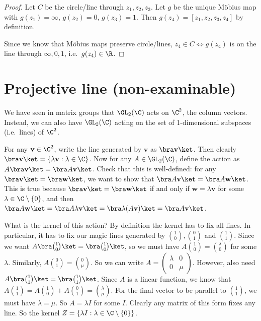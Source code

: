 \documentclass[a4paper]{article}
\begin{document}
\begin{proof}
  Let $C$ be the circle/line through $z_1, z_2, z_3$. Let $g$ be the unique M\"obius map with $g(z_1) = \infty$, $g(z_2) = 0$, $g(z_3) = 1$. Then $g(z_4) = [z_1, z_2, z_3, z_4]$ by definition.

  Since we know that M\"obius maps preserve circle/lines, $z_4\in C \Leftrightarrow g(z_4)$ is on the line through $\infty, 0, 1$, i.e.\ $g(z_4) \in \R$.
\end{proof}

\section{Projective line (non-examinable)}
We have seen in matrix groups that $\GL_2(\C)$ acts on $\C^2$, the column vectors. Instead, we can also have $\GL_2(\C)$ acting on the set of 1-dimensional subspaces (i.e.\ lines) of $\C^2$.

For any $\mathbf{v}\in \C^2$, write the line generated by $\mathbf{v}$ as $\bra \mathbf{v}\ket$. Then clearly $\bra \mathbf{v} \ket = \{\lambda \mathbf{v}: \lambda\in \C\}$. Now for any $A\in \GL_2(\C)$, define the action as $A\bra \mathbf{v}\ket = \bra A\mathbf{v}\ket$. Check that this is well-defined: for any $\bra \mathbf{v} \ket = \bra \mathbf{w}\ket$, we want to show that $\bra A\mathbf{v}\ket = \bra A\mathbf{w}\ket$. This is true because $\bra \mathbf{v} \ket = \bra \mathbf{w}\ket$ if and only if $\mathbf{w} = \lambda \mathbf{v}$ for some $\lambda\in \C\setminus\{0\}$, and then $\bra A\mathbf{w}\ket = \bra A\lambda\mathbf{v}\ket = \bra \lambda (A\mathbf{v})\ket = \bra A\mathbf{v}\ket$.

What is the kernel of this action? By definition the kernel has to fix all lines. In particular, it has to fix our magic lines generated by $\binom{1}{0}, \binom{0}{1}$ and $\binom{1}{1}$. Since we want $A\bra \binom{1}{0}\ket = \bra \binom{1}{0}\ket$, so we must have $A\binom{1}{0} = \binom{\lambda}{0}$ for some $\lambda$. Similarly, $A\binom{0}{1} = \binom{0}{\mu}$. So we can write $A =
\begin{pmatrix}
  \lambda & 0\\
  0 & \mu
\end{pmatrix}$. However, also need $A\bra \binom{1}{1}\ket = \bra\binom{1}{1}\ket$. Since $A$ is a linear function, we know that $A \binom{1}{1} = A \binom{1}{0} + A \binom{0}{1} = \binom{\lambda }{\mu}$. For the final vector to be parallel to $\binom{1}{1}$, we must have $\lambda = \mu$. So $A = \lambda I$ for some $I$. Clearly any matrix of this form fixes any line. So the kernel $Z = \{\lambda I: \lambda\in \C\setminus\{0\}\}$.
\end{document}

